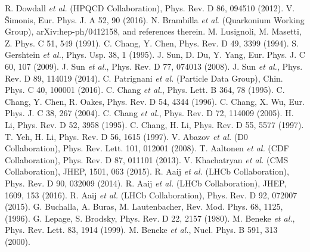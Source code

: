 \documentclass[preprint,superscriptaddress,nofootinbib]{revtex4}
\begin{document}
  \begin{thebibliography}{99}
          R. Dowdall {\em et al.} (HPQCD Collaboration), Phys. Rev. D 86, 094510 (2012).
          V. \v{S}imonis, Eur. Phys. J. A 52, 90 (2016).
          N. Brambilla {\em et al}. (Quarkonium Working Group),
          arXiv:hep-ph/0412158, and references therein.
          M. Lusignoli, M. Masetti, Z. Phys. C 51, 549 (1991).
          C. Chang, Y. Chen, Phys. Rev. D 49, 3399 (1994).
          S. Gershtein {\em et al.}, Phys. Usp. 38, 1 (1995).
          J. Sun, D. Du, Y. Yang, Eur. Phys. J. C 60, 107 (2009).
          J. Sun {\em et al.}, Phys. Rev. D 77, 074013 (2008).
          J. Sun {\em et al.}, Phys. Rev. D 89, 114019 (2014).
          C. Patrignani {\em et al.} (Particle Data Group), Chin. Phys. C 40, 100001 (2016).
          C. Chang {\em et al.}, Phys. Lett. B 364, 78 (1995).
          C. Chang, Y. Chen, R. Oakes, Phys. Rev. D 54, 4344 (1996).
          C. Chang, X. Wu, Eur. Phys. J. C 38, 267 (2004).
          C. Chang {\em et al.}, Phys. Rev. D 72, 114009 (2005).
          H. Li, Phys. Rev. D 52, 3958 (1995).
          C. Chang,  H. Li, Phys. Rev. D 55, 5577 (1997).
          T. Yeh, H. Li, Phys. Rev. D 56, 1615 (1997).
          V. Abazov {\em et al.} (D0 Collaboration), Phys. Rev. Lett. 101, 012001 (2008).
          T. Aaltonen {\em et al.} (CDF Collaboration), Phys. Rev. D 87, 011101 (2013).
          V. Khachatryan {\em et al.} (CMS Collaboration), JHEP, 1501, 063 (2015).
          R. Aaij {\em et al.} (LHCb Collaboration), Phys. Rev. D 90, 032009 (2014).
          R. Aaij {\em et al.} (LHCb Collaboration), JHEP, 1609, 153 (2016).
          R. Aaij {\em et al.} (LHCb Collaboration), Phys. Rev. D 92, 072007 (2015).
          G. Buchalla, A. Buras, M. Lautenbacher, Rev. Mod. Phys. 68, 1125, (1996).
          G. Lepage, S. Brodsky, Phys. Rev. D 22, 2157 (1980).
          M. Beneke {\em et al.}, Phys. Rev. Lett. 83, 1914 (1999).
          M. Beneke {\em et al.}, Nucl. Phys. B 591, 313 (2000).

\end{thebibliography}
\end{document}
